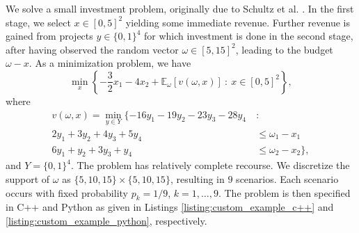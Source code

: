 \documentclass[12pt, english]{article}
\begin{document}
We solve a small investment problem, originally due to Schultz et al. \cite{schultz1998}. In the first stage, we select $x \in [0, 5]^2$ yielding some immediate revenue. Further revenue is gained from projects $y \in \{0, 1\}^4$ for which investment is done in the second stage, after having observed the random vector $\omega \in [5, 15]^2$, leading to the budget $\omega - x$. As a minimization problem, we have
\[ \min_x \left\{ -\frac{3}{2}x_1 -4 x_2 + \mathbb{E}_\omega [v(\omega, x)]~:~x \in [0, 5]^2 \right\}, \]
where
\[
\begin{split}
	v(\omega, x) = \min_{y \in Y} \{ -16y_1 -19y_2 -23y_3 - 28y_4~&: \\
							            2y_1 + 3y_2 + 4y_3 + 5y_4 &\le \omega_1 - x_1 \\
					                     6y_1 + y_2 + 3y_3 + y_4 &\le \omega_2 - x_2 \},
\end{split}
\]
and $Y = \{0, 1\}^4$. The problem has relatively complete recourse. We discretize the support of $\omega$ as $\{5, 10, 15\} \times \{5, 10, 15\}$, resulting in $9$ scenarios. Each scenario occurs with fixed probability $p_k = 1 / 9$, $k = 1, \ldots, 9$. The problem is then specified in C++ and Python as given in Listings \ref{listing:custom_example_c++} and \ref{listing:custom_example_python}, respectively.
\end{document}
